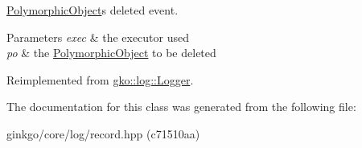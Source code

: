 \hyperlink{classgko_1_1PolymorphicObject}{Polymorphic\+Object}\textquotesingle{}s deleted event. 


\begin{DoxyParams}{Parameters}
{\em exec} & the executor used \\
\hline
{\em po} & the \hyperlink{classgko_1_1PolymorphicObject}{Polymorphic\+Object} to be deleted \\
\hline
\end{DoxyParams}


Reimplemented from \hyperlink{classgko_1_1log_1_1Logger}{gko\+::log\+::\+Logger}.



The documentation for this class was generated from the following file\+:\begin{DoxyCompactItemize}
\item 
ginkgo/core/log/record.\+hpp (c71510aa)\end{DoxyCompactItemize}

